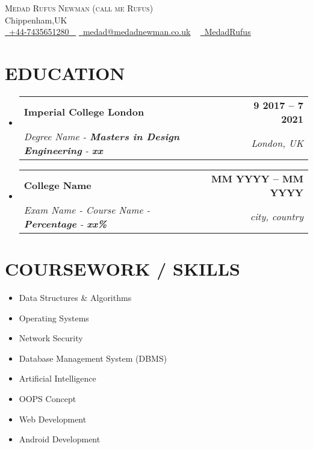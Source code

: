 \documentclass[letterpaper,11pt]{article}
\makeatletter
\newcommand{\resumeSubheading}[4]{
  \vspace{-2pt}\item
    \begin{tabular*}{1.0\textwidth}[t]{l@{\extracolsep{\fill}}r}
      \textbf{\large#1} & \textbf{\small #2} \\
      \textit{\large#3} & \textit{\small #4} \\
      
    \end{tabular*}\vspace{-7pt}
}
\newcommand{\resumeSubHeadingListStart}{\begin{itemize}[leftmargin=0.0in, label={}]}
\newcommand{\resumeSubHeadingListEnd}{\end{itemize}}
\makeatother
\begin{document}


\begin{center}
    {\Huge \scshape Medad Rufus Newman (call me Rufus)} \\ \vspace{1pt}
    Chippenham,UK \\ \vspace{1pt}
    \small \href{tel:+447435651280}{ \raisebox{-0.1\height}\faPhone\ \underline{+44-7435651280} ~} \href{mailto:medad@medadnewman.co.uk}{\raisebox{-0.2\height}\faEnvelope\  \underline{medad@medadnewman.co.uk}} ~ 
    \href{https://github.com/MedadRufus}{\raisebox{-0.2\height}\faGithub\ \underline{MedadRufus}} ~
    \vspace{-8pt}
\end{center}


\section{EDUCATION}
  \resumeSubHeadingListStart
    \resumeSubheading
      {Imperial College London}{9 2017 -- 7 2021}
      {Degree Name - \textbf{Masters in Design Engineering} - \textbf{xx}}{London, UK}
  \resumeSubHeadingListEnd
  
  \resumeSubHeadingListStart
    \resumeSubheading
      {College Name}{MM YYYY -- MM YYYY}
      {Exam Name - Course Name  - \textbf{Percentage} - \textbf{xx\%}}{city, country}
  \resumeSubHeadingListEnd

\section{COURSEWORK / SKILLS}
        \begin{multicols}{4}
            \begin{itemize}[itemsep=-2pt, parsep=5pt]
                \item Data Structures \& Algorithms
                \item Operating Systems
                \item Network Security
                \item Database Management System (DBMS)
                \item Artificial Intelligence
                \item OOPS Concept
                \item Web Development
                \item Android Development
            \end{itemize}
        \end{multicols}
        \vspace*{2.0\multicolsep}
\end{document}

